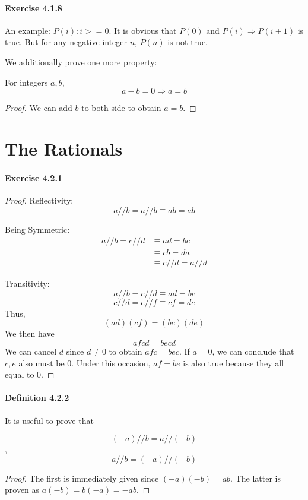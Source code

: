 \paragraph{Exercise 4.1.8} \label{exercise4.1.8}
An example: $P(i): i>=0$. It is obvious that $P(0)$ and $P(i) \Longrightarrow P(i+1)$ is true. But for any  
negative integer $n$, $P(n)$ is not true.

We additionally prove one more property:
\begin{lem}
For integers $a,b$,
\[
a-b=0\Longrightarrow a=b
\]
\end{lem}
\begin{proof}
We can add $b$ to both side to obtain $a=b$.
\end{proof}

\section{The Rationals}
\paragraph{Exercise 4.2.1} \label{exercise4.2.1}
\begin{proof}
Reflectivity:
\[
a//b = a//b \equiv ab=ab
\] 

Being Symmetric:
\begin{align*}
a//b = c//d 
&\equiv ad = bc \\
&\equiv cb = da \\
&\equiv c//d = a//d
\end{align*}

Transitivity:
\[
a//b = c//d \equiv ad = bc
\]
\[
c//d = e//f \equiv cf = de
\]
Thus,
\[
(ad)(cf) = (bc)(de)
\]
We then have
\[
afcd = becd
\]
We can cancel $d$ since $d \neq 0$ to obtain $afc=bec$. If $a=0$, we can conclude that $c,e$ also must be 
$0$. Under this occasion, $af=be$ is also true because they all equal to $0$. 
\end{proof}

\paragraph{Definition 4.2.2}
It is useful to prove that 
\begin{lem} \label{lem4.2.3}
\[
(-a)//b = a//(-b)
\]
,
\[
a//b = (-a)//(-b)
\]
\end{lem}
\begin{proof}
The first is immediately given since $(-a)(-b) = ab$. The latter is proven as $a(-b) = b(-a) = -ab$.
\end{proof}

